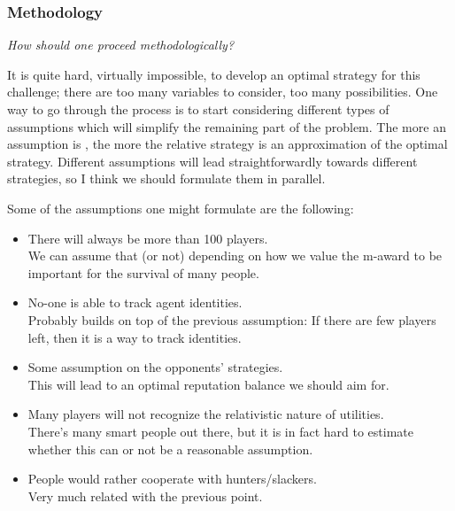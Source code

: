 \documentclass[10pt,fleqn]{article}
\begin{document}

\subsubsection{Methodology}
\emph{How should one proceed methodologically?}

It is quite hard, virtually impossible, to develop an optimal strategy for this
challenge; there are too many variables to consider, too many possibilities. One
way to go through the process is to start considering different types of
assumptions which will simplify the remaining part of the problem. The more an
assumption is , the more the relative strategy is an approximation
of the optimal strategy. Different assumptions will lead straightforwardly
towards different strategies, so I think we should formulate them in parallel.

Some of the assumptions one might formulate are the following:
\begin{itemize}
  \item There will always be more than 100 players. \hfill \\
  We can assume that (or not) depending on how we value the m-award to be
  important for the survival of many people.
  \item No-one is able to track agent identities. \hfill \\
  Probably builds on top of the previous assumption: If there are few players
  left, then it is a way to track identities.
  \item Some assumption on the opponents' strategies. \hfill \\
  This will lead to an optimal reputation balance we should aim for.
  \item Many players will not recognize the relativistic nature of utilities. \hfill \\
  There's many smart people out there, but it is in fact hard to estimate
  whether this can or not be a reasonable assumption.
  \item People would rather cooperate with hunters/slackers. \hfill \\
  Very much related with the previous point.
\end{itemize}
\end{document}
